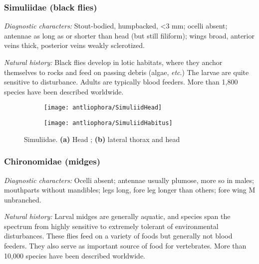 \subsubsection{Simuliidae (black flies)}
\noindent{}\textit{Diagnostic characters:} Stout-bodied, humpbacked, \textless3 mm; ocelli absent; antennae as long as or shorter than head (but still filiform); wings broad, anterior veins thick, posterior veins weakly sclerotized.\vspace{3mm}

\noindent{}\textit{Natural history:} Black flies develop in lotic habitats, where they anchor themselves to rocks and feed on passing debris (algae, \textit{etc}.) The larvae are quite sensitive to disturbance. Adults are typically blood feeders. More than 1,800 species have been described worldwide.

\begin{figure}[ht!]
    \centering
    \begin{subfigure}[ht!]{0.32\textwidth}
        \texttt{[image: antliophora/SimuliidHead]}
        \caption{}
        \label{fig:simuliid1}
    \end{subfigure}
    \qquad 
    \begin{subfigure}[ht!]{0.42\textwidth}
        \texttt{[image: antliophora/SimuliidHabitus]}
        \caption{}
        \label{fig:simuliid2}
    \end{subfigure}
    \caption{Simuliidae. \textbf{(a)} Head \citep[][Fig. 27.5]{mcalpine1981manual}; \textbf{(b)} lateral thorax and head \citep[][Fig. 27.1]{mcalpine1981manual}}\label{fig:simuliids}
\end{figure}

\subsubsection{Chironomidae (midges)}%
\noindent{}\textit{Diagnostic characters:} Ocelli absent; antennae usually plumose, more so in males; mouthparts without mandibles; legs long, fore leg longer than others; fore wing M unbranched.\vspace{3mm}

\noindent{}\textit{Natural history:} Larval midges are generally aquatic, and species span the spectrum from highly sensitive to extremely tolerant of environmental disturbances. These flies feed on a variety of foods but generally not blood feeders. They also serve as important source of food for vertebrates. More than 10,000 species have been described worldwide.


